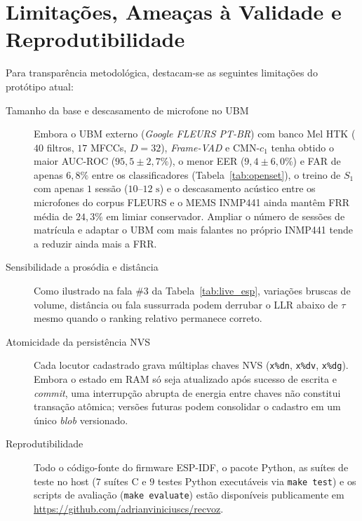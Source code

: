 \documentclass[9pt,technote,a4paper]{IEEEtran}
\newif\ifshowtodos
\newcommand{\todo}[2][TODO]{%
    \ifshowtodos
    \par\vspace{4pt}%
    \noindent\colorbox{amberbg}{%
        \parbox{\dimexpr\linewidth-2\fboxsep\relax}{%
            \footnotesize\textbf{\textcolor{amberfg}{[#1]}} #2%
        }%
    }%
    \par\vspace{4pt}%
    \fi
}
\begin{document}
\todo[TODO 4 --- Bateria completa ao vivo no ESP32-S3 (Tabela~\ref{tab:live_esp})]{%
    Com o firmware \texttt{recvoz-esp} no monitor serial (\texttt{idf.py -p /dev/ttyACM0 monitor}):
    (1) Testar $5$ falas de $S_2$ e anotar LLR médio, $d_{\mathrm{eq}}$, $\mathrm{mod}$ e taxa de acerto.
    (2) Testar $5$ falas de pelo menos $1$ pessoa não cadastrada ($S_u$) para validar rejeição (\texttt{DESCONHECIDO}).
    (3) Executar \texttt{enroll VISITANTE} ao vivo (7 janelas), testar $5$ falas de $S_v$ (e após \texttt{reboot} para validar NVS) e registrar a LLR do modelo adaptado na placa.
    (4) Ligar ruído estacionário (ex.\ ventilador/ar) sem fala e registrar o veto \texttt{RUIDO AMBIENTE} com o valor de $\mathrm{mod}$.
}

\section{Limitações, Ameaças à Validade e Reprodutibilidade}
\label{sec:limitacoes}

Para transparência metodológica, destacam-se as seguintes limitações do protótipo atual:
\begin{description}
    \item[Tamanho da base e descasamento de microfone no UBM] Embora o UBM externo (\textit{Google FLEURS PT-BR}) com banco Mel HTK ($40$ filtros, $17$ MFCCs, $D=32$), \textit{Frame-VAD} e CMN-$c_1$ tenha obtido o maior AUC-ROC ($95{,}5 \pm 2{,}7\%$), o menor EER ($9{,}4 \pm 6{,}0\%$) e FAR de apenas $6{,}8\%$ entre os classificadores (Tabela~\ref{tab:openset}), o treino de $S_1$ com apenas $1$ sessão ($10\text{--}12\text{ s}$) e o descasamento acústico entre os microfones do corpus FLEURS e o MEMS INMP441 ainda mantêm FRR média de $24{,}3\%$ em limiar conservador. Ampliar o número de sessões de matrícula e adaptar o UBM com mais falantes no próprio INMP441 tende a reduzir ainda mais a FRR.
    \item[Sensibilidade a prosódia e distância] Como ilustrado na fala \#3 da Tabela~\ref{tab:live_esp}, variações bruscas de volume, distância ou fala sussurrada podem derrubar o LLR abaixo de $\tau$ mesmo quando o ranking relativo permanece correto.
    \item[Atomicidade da persistência NVS] Cada locutor cadastrado grava múltiplas chaves NVS (\texttt{x\%dn}, \texttt{x\%dv}, \texttt{x\%dg}). Embora o estado em RAM só seja atualizado após sucesso de escrita e \textit{commit}, uma interrupção abrupta de energia entre chaves não constitui transação atômica; versões futuras podem consolidar o cadastro em um único \textit{blob} versionado.
    \item[Reprodutibilidade] Todo o código-fonte do firmware ESP-IDF, o pacote Python, as suítes de teste no host ($7$ suítes C e $9$ testes Python executáveis via \texttt{make test}) e os scripts de avaliação (\texttt{make evaluate}) estão disponíveis publicamente em \url{https://github.com/adrianviniciuscs/recvoz}.
\end{description}
\end{document}
